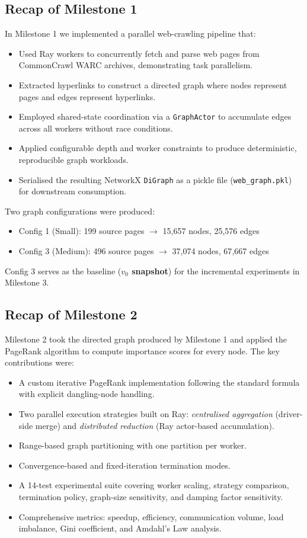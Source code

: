 \documentclass[11pt,a4paper]{article}
\begin{document}
\subsection{Recap of Milestone 1}
In Milestone 1 we implemented a parallel web-crawling pipeline that:
\begin{itemize}
    \item Used Ray workers to concurrently fetch and parse web pages from
    CommonCrawl WARC archives, demonstrating task parallelism.
    \item Extracted hyperlinks to construct a directed graph where nodes
    represent pages and edges represent hyperlinks.
    \item Employed shared-state coordination via a \texttt{GraphActor} to
    accumulate edges across all workers without race conditions.
    \item Applied configurable depth and worker constraints to produce
    deterministic, reproducible graph workloads.
    \item Serialised the resulting NetworkX \texttt{DiGraph} as a pickle
    file (\texttt{web\_graph.pkl}) for downstream consumption.
\end{itemize}

Two graph configurations were produced:
\begin{itemize}
    \item Config 1 (Small): 199 source pages $\rightarrow$ 15{,}657 nodes,
    25{,}576 edges
    \item Config 3 (Medium): 496 source pages $\rightarrow$ 37{,}074 nodes,
    67{,}667 edges
\end{itemize}

Config 3 serves as the baseline (\textbf{$v_0$ snapshot}) for the
incremental experiments in Milestone 3.

\subsection{Recap of Milestone 2}
Milestone 2 took the directed graph produced by Milestone 1 and applied
the PageRank algorithm to compute importance scores for every node. The
key contributions were:
\begin{itemize}
    \item A custom iterative PageRank implementation following the
    standard formula with explicit dangling-node handling.
    \item Two parallel execution strategies built on Ray: \emph{centralised
    aggregation} (driver-side merge) and \emph{distributed reduction}
    (Ray actor-based accumulation).
    \item Range-based graph partitioning with one partition per worker.
    \item Convergence-based and fixed-iteration termination modes.
    \item A 14-test experimental suite covering worker scaling, strategy
    comparison, termination policy, graph-size sensitivity, and damping
    factor sensitivity.
    \item Comprehensive metrics: speedup, efficiency, communication
    volume, load imbalance, Gini coefficient, and Amdahl's Law analysis.
\end{itemize}
\end{document}
